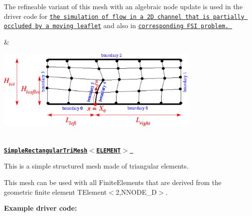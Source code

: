 \begin{center}
\begin{longtabu}
\begin{DoxyItemize}
\item The refineable variant of this mesh with an algebraic node update is used in the driver code for \href{../../../navier_stokes/channel_with_leaflet/html/index.html}{\tt the simulation of flow in a 2D channel that is partially occluded by a moving leaflet} and also in \href{../../../interaction/fsi_channel_with_leaflet/html/index.html}{\tt corresponding F\+SI problem. }
\end{DoxyItemize}& 
\begin{DoxyImageNoCaption}
  \mbox{\includegraphics[width=0.75\textwidth]{channel_with_leaflet_mesh}}
\end{DoxyImageNoCaption}
   \\
\href{classoomph_1_1SimpleRectangularTriMesh.html}{\tt {\bfseries  Simple\+Rectangular\+Tri\+Mesh$<$\+E\+L\+E\+M\+E\+N\+T$>$ }} ~\newline
~\newline

\begin{DoxyItemize}
\item This is a simple structured mesh made of triangular elements.
\item This mesh can be used with all {\ttfamily Finite\+Elements} that are derived from the geometric finite element {\ttfamily T\+Element$<$2,\+N\+N\+O\+D\+E\+\_\+D$>$}.
\end{DoxyItemize}{\bfseries Example driver code\+:} ~\newline


\end{longtabu}
\end{center}
